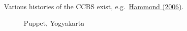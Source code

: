 \documentclass[
  letterpaper,
]{book}
\begin{document}
Various histories of the CCBS exist,
e.g.~\href{https://www.bankofengland.co.uk/-/media/boe/files/quarterly-bulletin/2006/the-centre-for-central-banking-studies.pdf}{Hammond
(2006)}.

\begin{figure}

\begin{minipage}[t]{0.50\linewidth}

{\centering 


\caption{Puppet, Yogyakarta}

}

\end{minipage}%
%
\begin{minipage}[t]{0.50\linewidth}

{\centering 

}
\end{minipage}
\end{figure}
\end{document}

